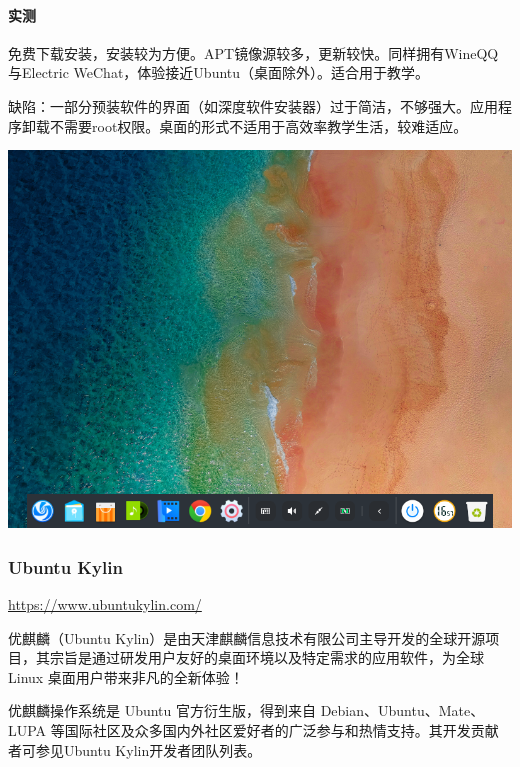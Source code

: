 \paragraph{实测}
免费下载安装，安装较为方便。APT镜像源较多，更新较快。同样拥有WineQQ与Electric WeChat，体验接近Ubuntu（桌面除外）。适合用于教学。\par
缺陷：一部分预装软件的界面（如深度软件安装器）过于简洁，不够强大。应用程序卸载不需要root权限。桌面的形式不适用于高效率教学生活，较难适应。
\begin{center}
	\includegraphics[scale=0.5]{pic/deepin}
\end{center}
\subsubsection{Ubuntu Kylin}
\url{https://www.ubuntukylin.com/}\par
优麒麟（Ubuntu Kylin）是由天津麒麟信息技术有限公司主导开发的全球开源项目，其宗旨是通过研发用户友好的桌面环境以及特定需求的应用软件，为全球 Linux 桌面用户带来非凡的全新体验！\par
优麒麟操作系统是 Ubuntu 官方衍生版，得到来自 Debian、Ubuntu、Mate、LUPA 等国际社区及众多国内外社区爱好者的广泛参与和热情支持。其开发贡献者可参见Ubuntu Kylin开发者团队列表。\cite{ukinfo}
